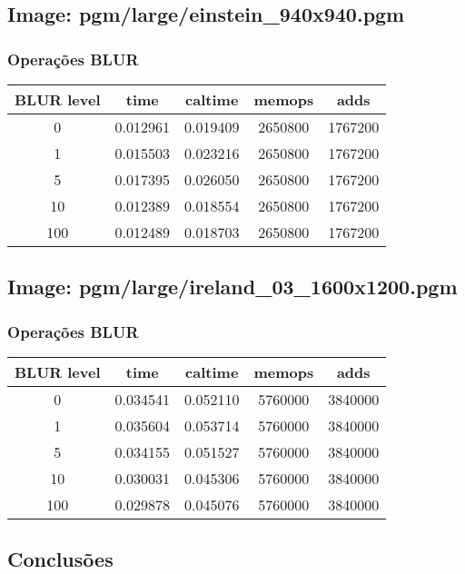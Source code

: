 \documentclass{report}
\begin{document}
\subsection*{Image: pgm/large/einstein\_940x940.pgm}

\subsubsection*{Operações BLUR}
\begin{tabular}{ccccc}
\toprule
\textbf{BLUR level} & \textbf{time} & \textbf{caltime} & \textbf{memops} & \textbf{adds} \\
\midrule
0 & 0.012961 & 0.019409 & 2650800 & 1767200 \\
1 & 0.015503 & 0.023216 & 2650800 & 1767200 \\
5 & 0.017395 & 0.026050 & 2650800 & 1767200 \\
10 & 0.012389 & 0.018554 & 2650800 & 1767200 \\
100 & 0.012489 & 0.018703 & 2650800 & 1767200 \\
\bottomrule
\end{tabular}

\subsection*{Image: pgm/large/ireland\_03\_1600x1200.pgm}

\subsubsection*{Operações BLUR}
\begin{tabular}{ccccc}
\toprule
\textbf{BLUR level} & \textbf{time} & \textbf{caltime} & \textbf{memops} & \textbf{adds} \\
\midrule
0 & 0.034541 & 0.052110 & 5760000 & 3840000 \\
1 & 0.035604 & 0.053714 & 5760000 & 3840000 \\
5 & 0.034155 & 0.051527 & 5760000 & 3840000 \\
10 & 0.030031 & 0.045306 & 5760000 & 3840000 \\
100 & 0.029878 & 0.045076 & 5760000 & 3840000 \\
\bottomrule
\end{tabular}

\subsection{Conclusões}







\printbibliography
\end{document}
